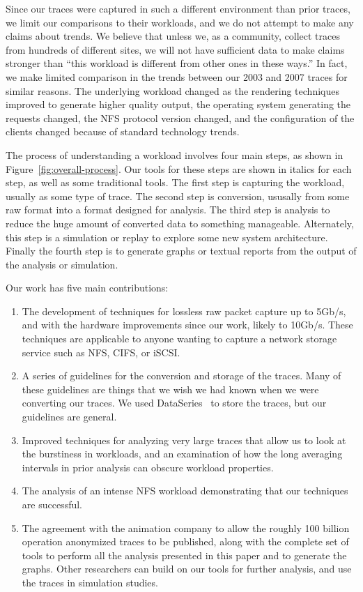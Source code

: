 Since our traces were captured in such a different environment than
prior traces, we limit our comparisons to their workloads, and we
do not attempt to make any claims about trends.  We believe that
unless we, as a community, collect traces from hundreds of different
sites, we will not have sufficient data to make claims stronger than
``this workload is different from other ones in these ways.''  In
fact, we make limited comparison in the trends between our 2003 and
2007 traces for similar reasons.  The underlying workload changed
as the rendering techniques improved to generate higher quality output,
the operating system generating the requests changed, the NFS
protocol version changed, and the configuration of the clients 
changed because of standard technology trends.

The process of understanding a workload involves four main
steps, as shown in Figure~\ref{fig:overall-process}.  Our tools for
these steps are shown in italics for each step, as well as some
traditional tools.  The first step is capturing the workload, usually
as some type of trace.  The second step is conversion, ususally from
some raw format into a format designed for analysis.  The third step
is analysis to reduce the huge amount of converted data to
something manageable.  Alternately, this step is a simulation or replay to
explore some new system architecture.  Finally the fourth step is to
generate graphs or textual reports from the output of the analysis or
simulation.

Our work has five main contributions:

\begin{enumerate}
\item The development of techniques for lossless raw packet capture up to
5Gb/s, and with the hardware improvements since our work, likely to
10Gb/s.  These techniques are applicable to anyone wanting to capture
a network storage service such as NFS, CIFS, or iSCSI.

\item A series of guidelines for the conversion and storage of the
traces.  Many of these guidelines are things that we wish we had known
when we were converting our traces.  We used
DataSeries~\cite{DataSeriesOSR2009} to store the traces, but our
guidelines are general.

\item Improved techniques for analyzing very large traces that allow
us to look at the burstiness in workloads, and an examination of how
the long averaging intervals in prior analysis can obscure workload
properties.

\item The analysis of an intense NFS workload demonstrating that our
techniques are successful.

\item The agreement with the animation company to allow the roughly
100 billion operation anonymized traces to be published, along with
the complete set of tools to perform all the analysis presented in
this paper and to generate the graphs.  Other
researchers can build on our tools for further analysis, and use
the traces in simulation studies.
\end{enumerate}

